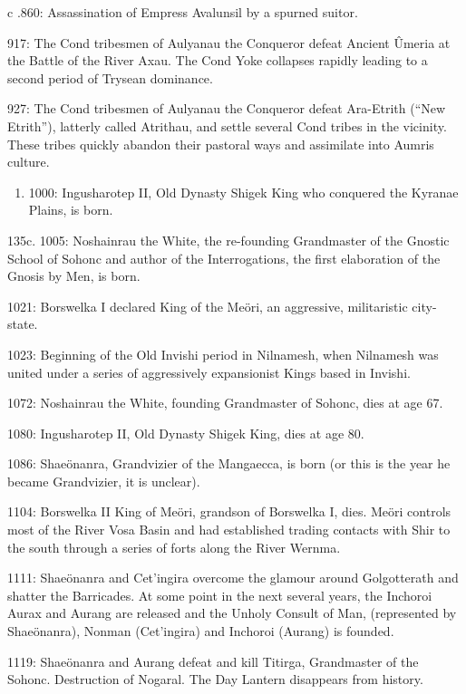 \documentclass[]{book}
\providecommand{\tightlist}{%
  \setlength{\itemsep}{0pt}\setlength{\parskip}{0pt}}
\begin{document}
c .860: Assassination of Empress Avalunsil by a spurned suitor.

917: The Cond tribesmen of Aulyanau the Conqueror defeat Ancient Ûmeria at the
Battle of the River Axau. The Cond Yoke collapses rapidly leading to a second
period of Trysean dominance.

927: The Cond tribesmen of Aulyanau the Conqueror defeat Ara-Etrith (``New
Etrith''), latterly called Atrithau, and settle several Cond tribes in the vicinity.
These tribes quickly abandon their pastoral ways and assimilate into Aumris
culture.

\begin{enumerate}
\def\labelenumi{\alph{enumi}.}
\setcounter{enumi}{2}
\tightlist
\item
  1000: Ingusharotep II, Old Dynasty Shigek King who conquered the Kyranae
  Plains, is born.
\end{enumerate}

135c. 1005: Noshainrau the White, the re-founding Grandmaster of the Gnostic School
of Sohonc and author of the Interrogations, the first elaboration of the Gnosis
by Men, is born.

1021: Borswelka I declared King of the Meöri, an aggressive, militaristic city-state.

1023: Beginning of the Old Invishi period in Nilnamesh, when Nilnamesh was united
under a series of aggressively expansionist Kings based in Invishi.

1072: Noshainrau the White, founding Grandmaster of Sohonc, dies at age 67.

1080: Ingusharotep II, Old Dynasty Shigek King, dies at age 80.

1086: Shaeönanra, Grandvizier of the Mangaecca, is born (or this is the year he
became Grandvizier, it is unclear).

1104: Borswelka II King of Meöri, grandson of Borswelka I, dies. Meöri controls most
of the River Vosa Basin and had established trading contacts with Shir to the
south through a series of forts along the River Wernma.

1111: Shaeönanra and Cet'ingira overcome the glamour around Golgotterath and
shatter the Barricades. At some point in the next several years, the
Inchoroi Aurax and Aurang are released and the Unholy Consult of Man,
(represented by Shaeönanra), Nonman (Cet'ingira) and Inchoroi (Aurang) is
founded.

1119: Shaeönanra and Aurang defeat and kill Titirga, Grandmaster of the Sohonc.
Destruction of Nogaral. The Day Lantern disappears from history.
\end{document}
